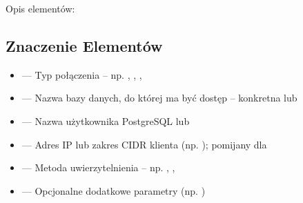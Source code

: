 \documentclass[a4paper,11pt,polish]{sphinxmanual}
\begin{document}
\sphinxAtStartPar
Opis elementów:


\subsection{Znaczenie Elementów}
\label{\detokenize{Bezpieczenstwo/index:znaczenie-elementow}}\begin{itemize}
\item {} 
\sphinxAtStartPar
{} — Typ połączenia – np. , , , 

\item {} 
\sphinxAtStartPar
{} — Nazwa bazy danych, do której ma być dostęp – konkretna lub 

\item {} 
\sphinxAtStartPar
{} — Nazwa użytkownika PostgreSQL lub 

\item {} 
\sphinxAtStartPar
{} — Adres IP lub zakres CIDR klienta (np. ); pomijany dla 

\item {} 
\sphinxAtStartPar
{} — Metoda uwierzytelnienia – np. , , 

\item {} 
\sphinxAtStartPar
\sphinxcode{\sphinxupquote{{[}opcje{]}}} — Opcjonalne dodatkowe parametry (np. )

\end{itemize}
\end{document}
